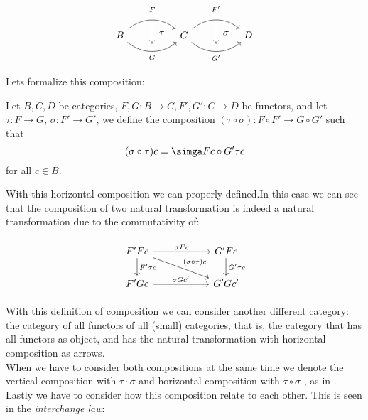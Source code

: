 \[
\begin{tikzcd}[column sep=huge]
B
  \arrow[bend left=40]{r}[name=F,label=above:$\scriptstyle F$]{}
  \arrow[bend right=40]{r}[name=G,label=below:$\scriptstyle G$]{} &
C
  \arrow[bend left=40]{r}[name=F',label=above:$\scriptstyle F'$]{}
  \arrow[bend right=40]{r}[name=G',label=below:$\scriptstyle G'$]{}&
D
    \arrow[shorten <=3pt,shorten >=3pt,Rightarrow,to path={(F) -- node[label=right:$\tau$] {} (G)}]{}
\arrow[shorten <=3pt,shorten >=3pt,Rightarrow,to path={(F') -- node[label=right:$\sigma$] {} (G')}]{}
\end{tikzcd}
\]

Lets formalize this composition:
\begin{definition}\label{horizontal-composition}
Let $B,C,D$ be categories, $F,G: B \to C, F',G':C\to D$ be functors, and let $\tau: F \to G$, $\sigma:F'\to G'$, we define the composition $(\tau \circ \sigma): F\circ F' \to G\circ G'$ such that $$(\sigma \circ \tau) c = \simga F c \circ G' \tau c$$  for all $c\in B$.
\end{definition}

With this horizontal composition we can properly defined.In this case we can see that the composition of two natural transformation is indeed a natural transformation due to the commutativity of:

\[
  \begin{tikzpicture}
  \node {\begin{tikzcd}[column sep=20mm]
      F'Fc      \ar[r,"\sigma F c"]
      \ar[d,"F'\tau c"]
      \ar[dr,"(\sigma\circ \tau)c"]
      & G'Fc\ar[d,"G'\tau c"]\\
      F'Gc\ar[r,"\sigma Gc'"] & G'Gc'
  \end{tikzcd}};
\end{tikzpicture}
\]
 

With this definition of composition we can consider another different category: the category of all functors of all (small) categories, that is, the category that has all functors as object, and has the natural transformation with horizontal composition as arrows.\\

When we have to consider both compositions at the same time we denote the vertical composition with $\tau \cdot \sigma$ and horizontal composition with $\tau \circ \sigma$ , as in  \cite{mac2013categories}. Lastly we have to consider how this composition relate to each other. This is seen in the \emph{interchange law}:\\

